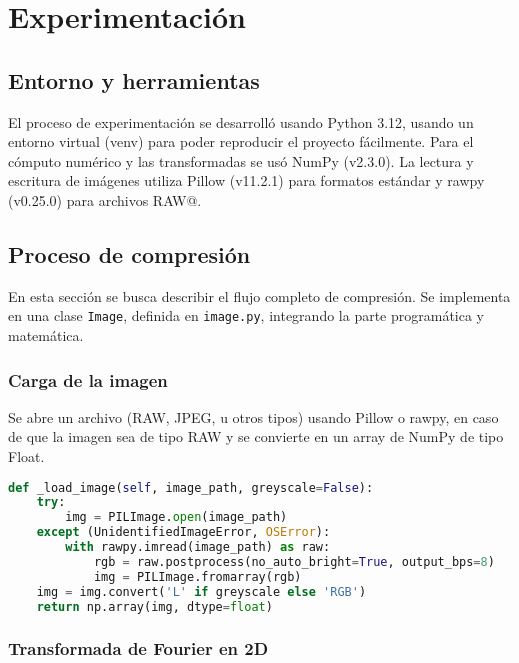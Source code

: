 \section{Experimentación}

\subsection{Entorno y herramientas}

El proceso de experimentación se desarrolló usando Python 3.12, usando un entorno virtual (venv) para poder reproducir el proyecto fácilmente. Para el cómputo numérico y las transformadas se usó NumPy (v2.3.0). La lectura y escritura de imágenes utiliza Pillow (v11.2.1) para formatos estándar y rawpy (v0.25.0) para archivos RAW@.

\subsection{Proceso de compresión}

En esta sección se busca describir el flujo completo de compresión.
Se implementa en una clase \texttt{Image}, definida en \texttt{image.py}, integrando la parte programática y matemática.

\subsubsection{Carga de la imagen}

Se abre un archivo (RAW, JPEG, u otros tipos) usando Pillow o rawpy, en caso de que la imagen sea de tipo RAW y se convierte en un array de NumPy de tipo Float.

\begin{lstlisting}[language=Python, caption={Método \_load\_image}, label={lst:load_image}]
def _load_image(self, image_path, greyscale=False):
    try:
        img = PILImage.open(image_path)
    except (UnidentifiedImageError, OSError):
        with rawpy.imread(image_path) as raw:
            rgb = raw.postprocess(no_auto_bright=True, output_bps=8)
            img = PILImage.fromarray(rgb)
    img = img.convert('L' if greyscale else 'RGB')
    return np.array(img, dtype=float)
\end{lstlisting}

\subsubsection{Transformada de Fourier en 2D}

